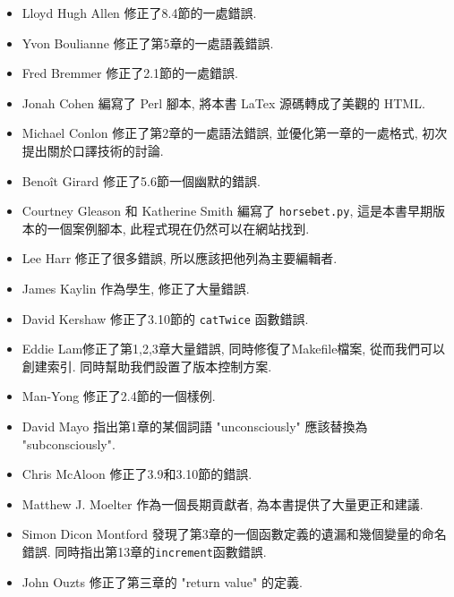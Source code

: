 \documentclass[10pt]{book}
\begin{document}
\begin{itemize}

\small
\item Lloyd Hugh Allen 修正了8.4節的一處錯誤. 

\item Yvon Boulianne 修正了第5章的一處語義錯誤. 

\item Fred Bremmer 修正了2.1節的一處錯誤. 

\item Jonah Cohen 編寫了 Perl 腳本, 將本書 LaTex 源碼轉成了美觀的 HTML. 

\item Michael Conlon 修正了第2章的一處語法錯誤, 並優化第一章的一處格式, 
初次提出關於口譯技術的討論. 

\item Beno\^{i}t Girard 修正了5.6節一個幽默的錯誤. 

\item Courtney Gleason 和 Katherine Smith 編寫了 {\tt horsebet.py}, 
這是本書早期版本的一個案例腳本, 此程式現在仍然可以在網站找到. 

\item Lee Harr 修正了很多錯誤, 所以應該把他列為主要編輯者. 

\item James Kaylin 作為學生, 修正了大量錯誤. 

\item David Kershaw 修正了3.10節的 {\tt catTwice} 函數錯誤. 

\item Eddie Lam修正了第1,2,3章大量錯誤, 同時修復了Makefile檔案, 
從而我們可以創建索引. 同時幫助我們設置了版本控制方案. 

\item Man-Yong 修正了2.4節的一個樣例. 

\item David Mayo 指出第1章的某個詞語 "unconsciously"
應該替換為 "subconsciously".

\item Chris McAloon 修正了3.9和3.10節的錯誤. 

\item Matthew J. Moelter 作為一個長期貢獻者, 為本書提供了大量更正和建議. 

\item Simon Dicon Montford 發現了第3章的一個函數定義的遺漏和幾個變量的命名錯誤. 
同時指出第13章的{\tt increment}函數錯誤. 

\item John Ouzts 修正了第三章的 "return value" 的定義. 


\end{itemize}
\end{document}
